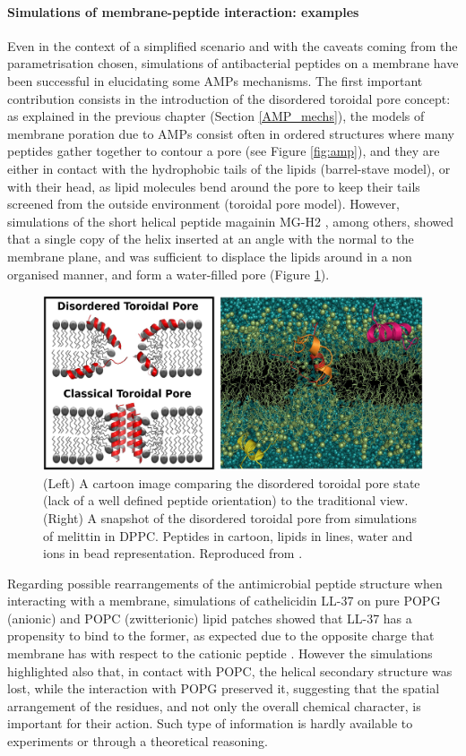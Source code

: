 \paragraph{Simulations of membrane-peptide interaction: examples} Even in the context of a simplified scenario and with the caveats coming from the parametrisation chosen, simulations of antibacterial peptides on a membrane have been successful in elucidating some AMPs mechanisms.
%
The first important contribution consists in the introduction of the disordered toroidal pore concept: as explained in the previous chapter (Section \ref{AMP_mechs}), the models of membrane poration due to AMPs consist often in ordered structures where many peptides gather together to contour a pore (see Figure \ref{fig:amp}), and they are either in contact with the hydrophobic tails of the lipids (barrel-stave model), or with their head, as lipid molecules bend around the pore to keep their tails screened from the outside environment (toroidal pore model). However, simulations of the short helical peptide magainin MG-H2 \citep{Leontiadou2006}, among others, showed that a single copy of the helix inserted at an angle with the normal to the membrane plane, and was sufficient to displace the lipids around in a non organised manner, and form a water-filled pore (Figure \ref{fig:dis_pore}).
%
\begin{figure}[t!]
\centering
\includegraphics[width=0.8\linewidth]{2methods/pics/disordered_pore.jpg}
%
\caption[Disordered pore model]{(Left) A cartoon image comparing the disordered toroidal pore state (lack of a well defined peptide orientation) to the traditional view. (Right) A snapshot of the disordered toroidal pore from simulations of melittin in DPPC. Peptides in cartoon, lipids in lines, water and ions in bead representation. Reproduced from \citet{Sengupta2008}.}
\label{fig:dis_pore}
\end{figure}

Regarding possible rearrangements of the antimicrobial peptide structure when interacting with a membrane, simulations of cathelicidin LL-37 on pure POPG (anionic) and POPC (zwitterionic) lipid patches showed that LL-37 has a propensity to bind to the former, as expected due to the opposite charge that membrane has with respect to the cationic peptide \citep{Zhao2018}. However the simulations highlighted also that, in contact with POPC, the helical secondary structure was lost, while the interaction with POPG preserved it, suggesting that the spatial arrangement of the residues, and not only the overall chemical character, is important for their action. Such type of information is hardly available to experiments or through a theoretical reasoning.

